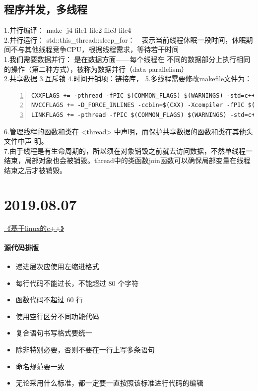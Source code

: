 \documentclass[UTF8,a4paper]{ctexart}
\begin{document}
\subsection{程序并发，多线程}
1.并行编译： make -j4 file1 file2 file3 file4\\
2.并行运行： 
std::this_thread::sleep_for：　表示当前线程休眠一段时间，休眠期间不与其他线程竞争CPU，根据线程需求，等待若干时间\\
1.我们需要数据并行： 是在数据方面——每个线程在
不同的数据部分上执行相同的操作（第二种方式），被称为数据并行（data
parallelism）\\
2.共享数据
3.互斥锁
4.时间开销项：链接库，
5.多线程需要修改makefile文件为：\\
 \begin{lstlisting}[language={[ANSI]C},numbers=left,numberstyle=\tiny]  
CXXFLAGS += -pthread -fPIC $(COMMON_FLAGS) $(WARNINGS) -std=c++11
NVCCFLAGS += -D_FORCE_INLINES -ccbin=$(CXX) -Xcompiler -fPIC $(COMMON_FLAGS) -std=c++11
LINKFLAGS += -pthread -fPIC $(COMMON_FLAGS) $(WARNINGS) -std=c++11
   \end{lstlisting}
   6.管理线程的函数和类在 <thread> 中声明，而保护共享数据的函数和类在其他头文件中声
明。\\
7.由于线程是有生命周期的，所以须在对象销毁之前就去访问数据，不然单线程一结束，局部对象也会被销毁。thread中的类函数join函数可以确保局部变量在线程结束之后才被销毁。\\
\section{2019.08.07}
\href{http://www.xuetangx.com/courses/course-v1:TsinghuaX+20740084X+2019_T1/about}{《基于linux的c++》}
\paragraph{源代码排版}
\begin{itemize}
\item 递进层次应使用左缩进格式
\item 每行代码不能过长，不能超过 $80$ 个字符
\item 函数代码不超过 $60$ 行
\item 使用空行区分不同功能代码
\item 复合语句书写格式要统一
\item 除非特别必要，否则不要在一行上写多条语句
\item 命名规范要一致
\item 无论采用什么标准，都一定要一直按照该标准进行代码的编辑
\end{itemize}
\end{document}
